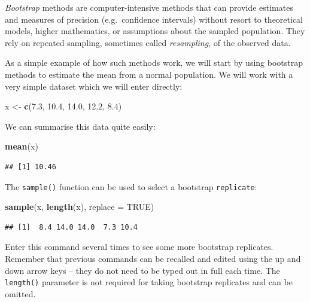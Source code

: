 \documentclass[12pt,a4paper]{book}
\newenvironment{Shaded}{\begin{snugshade}}{\end{snugshade}}
\newcommand{\KeywordTok}[1]{\textcolor[rgb]{0.13,0.29,0.53}{\textbf{#1}}}
\newcommand{\DataTypeTok}[1]{\textcolor[rgb]{0.13,0.29,0.53}{#1}}
\newcommand{\FloatTok}[1]{\textcolor[rgb]{0.00,0.00,0.81}{#1}}
\newcommand{\StringTok}[1]{\textcolor[rgb]{0.31,0.60,0.02}{#1}}
\newcommand{\OtherTok}[1]{\textcolor[rgb]{0.56,0.35,0.01}{#1}}
\newcommand{\NormalTok}[1]{#1}
\theoremstyle{definition}
\theoremstyle{definition}
\theoremstyle{definition}
\theoremstyle{remark}
\begin{document}
\emph{Bootstrap} methods are computer-intensive methods that can provide
estimates and measures of precision (e.g.~confidence intervals) without
resort to theoretical models, higher mathematics, or assumptions about
the sampled population. They rely on repeated sampling, sometimes called
\emph{resampling}, of the observed data.

As a simple example of how such methods work, we will start by using
bootstrap methods to estimate the mean from a normal population. We will
work with a very simple dataset which we will enter directly:

\begin{Shaded}
\begin{Highlighting}[]
\NormalTok{x <-}\StringTok{ }\KeywordTok{c}\NormalTok{(}\FloatTok{7.3}\NormalTok{, }\FloatTok{10.4}\NormalTok{, }\FloatTok{14.0}\NormalTok{, }\FloatTok{12.2}\NormalTok{, }\FloatTok{8.4}\NormalTok{)}
\end{Highlighting}
\end{Shaded}

We can summarise this data quite easily:

\begin{Shaded}
\begin{Highlighting}[]
\KeywordTok{mean}\NormalTok{(x)}
\end{Highlighting}
\end{Shaded}

\begin{verbatim}
## [1] 10.46
\end{verbatim}

The \texttt{sample()} function can be used to select a bootstrap
\texttt{replicate}:

\begin{Shaded}
\begin{Highlighting}[]
\KeywordTok{sample}\NormalTok{(x, }\KeywordTok{length}\NormalTok{(x), }\DataTypeTok{replace =} \OtherTok{TRUE}\NormalTok{)}
\end{Highlighting}
\end{Shaded}

\begin{verbatim}
## [1]  8.4 14.0 14.0  7.3 10.4
\end{verbatim}

Enter this command several times to see some more bootstrap replicates.
Remember that previous commands can be recalled and edited using the up
and down arrow keys -- they do not need to be typed out in full each
time. The \texttt{length()} parameter is not required for taking
bootstrap replicates and can be omitted.
\end{document}
